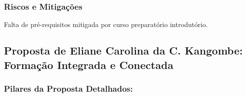 \documentclass[12pt,a4paper]{article}
\begin{document}
\subsubsection*{Riscos e Mitigações}
Falta de pré-requisitos mitigada por curso preparatório introdutório.


\subsection{Proposta de Eliane Carolina da C. Kangombe: Formação Integrada e Conectada}

\subsubsection*{Pilares da Proposta Detalhados:}
\end{document}
